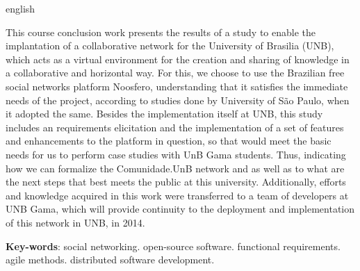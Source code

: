 \begin{resumo}[Abstract]
  \begin{otherlanguage*}{english}  

  This course conclusion work presents the results of a study to enable the
  implantation of a collaborative network for the University of
  Brasilia (UNB), which acts as a virtual environment for the creation and
  sharing of knowledge in a collaborative and horizontal way.
  For this, we choose to use the Brazilian free social networks platform
  Noosfero, understanding that it satisfies the immediate needs of the
  project, according to studies done by University of São Paulo, when it
  adopted the same.
  Besides the implementation itself at UNB, this study includes an requirements
  elicitation and the implementation of a set of features and enhancements to
  the platform in question, so that would meet the basic needs for us to perform
  case studies with UnB Gama students.
  Thus, indicating how we can formalize the Comunidade.UnB network and
  as well as to what are the next steps that best meets the public at this
  university.
  Additionally, efforts and knowledge acquired in this work were transferred
  to a team of developers at UNB Gama, which will provide continuity to the
  deployment and implementation of this network in UNB, in 2014.
   

  \vspace{\onelineskip}
 
  \noindent 
  \textbf{Key-words}: social networking. open-source software. functional requirements. agile methods. distributed software development.
  \end{otherlanguage*}
\end{resumo}
